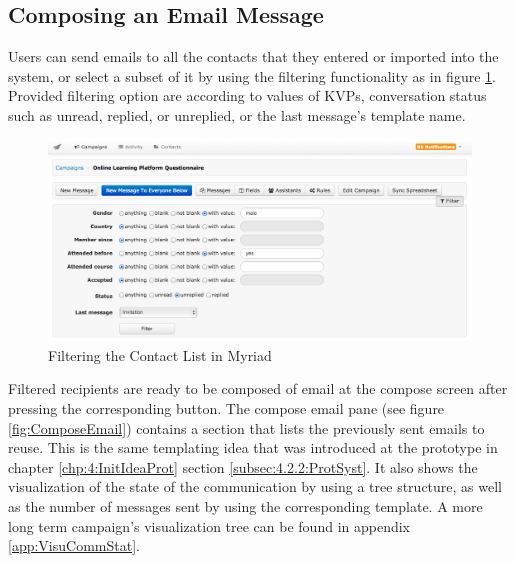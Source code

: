 \subsection{Composing an Email Message}
\label{subsec:5.2.4:CompEmaiMess}

Users can send emails to all the contacts that they entered or imported into the system, or select a subset of it by using the filtering functionality as in figure \ref{fig:ContactFilters}. Provided filtering option are according to values of \ac{KVP}s, conversation status such as unread, replied, or unreplied, or the last message's template name.

\begin{figure}[htbp]
	\centering
	\includegraphics[width=1.00\textwidth]{imgs/ContactFilters.png}
	\caption[Filtering the Contact List in Myriad]{Filtering the Contact List in Myriad}
	\label{fig:ContactFilters}
\end{figure}

Filtered recipients are ready to be composed of email at the compose screen after pressing the corresponding button. The compose email pane (see figure \ref{fig:ComposeEmail}) contains a section that lists the previously sent emails to reuse. This is the same templating idea that was introduced at the prototype in chapter \ref{chp:4:InitIdeaProt} section \ref{subsec:4.2.2:ProtSyst}. It also shows the visualization of the state of the communication by using a tree structure, as well as the number of messages sent by using the corresponding template. A more long term campaign's visualization tree can be found in appendix \ref{app:VisuCommStat}.

